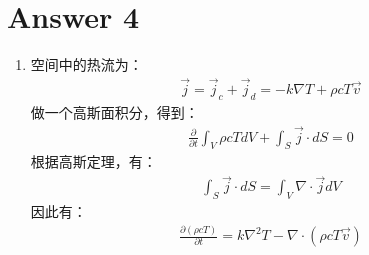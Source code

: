 \section*{Answer 4}
\begin{enumerate}
	\item 空间中的热流为：
	\begin{align*}
		\vec{j} = \vec{j}_c + \vec{j}_d = -k \nabla T + \rho c T\vec{v} 
	\end{align*}
	做一个高斯面积分，得到：
	\begin{align*}
		\frac{\partial}{\partial t} \int_V \rho c T dV + \int_S \vec{j} \cdot dS = 0
	\end{align*}
		根据高斯定理，有：
	\begin{align*}
		\int_S \vec{j} \cdot dS = \int_V \nabla \cdot \vec{j} dV
	\end{align*}
		因此有：
	\begin{align*}
		\frac{\partial (\rho c T)}{\partial t} = k \nabla^2 T -  \nabla \cdot(\rho c T\vec{v})
	\end{align*}
		

\end{enumerate}
